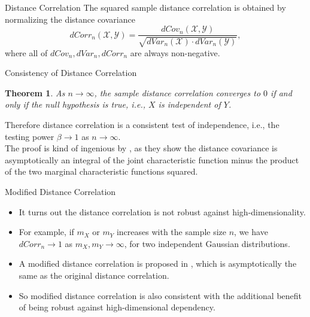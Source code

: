 \documentclass{beamer}
\newtheorem{thm}{Theorem}
\begin{document}
\begin{frame}{Distance Correlation}
The squared sample distance correlation is obtained by normalizing the distance covariance
\begin{equation}
\label{dCorrEqu}
dCorr_{n}(\mathcal{X},\mathcal{Y})=\frac{dCov_{n}(\mathcal{X},\mathcal{Y})}{\sqrt{dVar_{n}(\mathcal{X}) \cdot dVar_{n}(\mathcal{Y})}},
\end{equation}
where all of $dCov_{n}, dVar_{n}, dCorr_{n}$ are always non-negative. 
\end{frame}

\begin{frame}{Consistency of Distance Correlation}
\begin{thm} 
As $n \rightarrow \infty$, the sample distance correlation converges to $0$ if and only if the null hypothesis is true, i.e., $X$ is independent of $Y$.
\end{thm} 
\pause
\medskip
Therefore distance correlation is a consistent test of independence, i.e., the testing power $\beta \rightarrow 1$ as $n \rightarrow \infty$.\\
\pause
\medskip
The proof is kind of ingenious by \cite{SzekelyRizzoBakirov2007}, as they show the distance covariance is asymptotically an integral of the joint characteristic function minus the product of the two marginal characteristic functions squared.
\end{frame}

\begin{frame}{Modified Distance Correlation}
\begin{itemize}[<+->]
\item It turns out the distance correlation is not robust against high-dimensionality.
\item For example, if $m_{X}$ or $m_{Y}$ increases with the sample size $n$, we have $dCorr_{n} \rightarrow 1$ as $m_{X}, m_{Y} \rightarrow \infty$, for two independent Gaussian distributions.
\item A modified distance correlation is proposed in \cite{SzekelyRizzo2013a}, which is asymptotically the same as the original distance correlation.
\item So modified distance correlation is also consistent with the additional benefit of being robust against high-dimensional dependency.
\end{itemize}
\end{frame}
\end{document}
